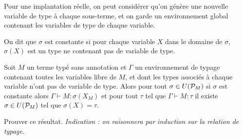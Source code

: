 \begin{rmk}
    Pour une implantation réelle, on peut considérer qu'on génère une nouvelle variable de type à chaque sous-terme, et on garde un environnement global contenant les variables de type de chaque variable.
\end{rmk}

\begin{defi}
    On dit que $\sigma$ est constante si pour chaque variable $X$ dans le domaine de $\sigma$, $\sigma(X)$ est un type ne contenant pas de variable de type.
\end{defi}

\begin{them}
    Soit $M$ un terme typé sans annotation et $\Gamma$ un environnement de typage contenant toutes les variables libre de $M$, et dont les types associés à chaque variable n'ont pas de variable de type. Alors pour tout $\sigma\in U(\mathcal P_M)$ si $\sigma$ est constante alors $\Gamma\vdash M : \sigma(X_M)$ et pour tout $\tau$ tel que $\Gamma\vdash M : \tau$ il existe $\sigma\in U(\mathcal P_M)$ tel que $\sigma(X) = \tau$.
\end{them}

\begin{exo}
    Prouver ce résultat. \textit{Indication : on raisonnera par induction sur la relation de typage.}
\end{exo}